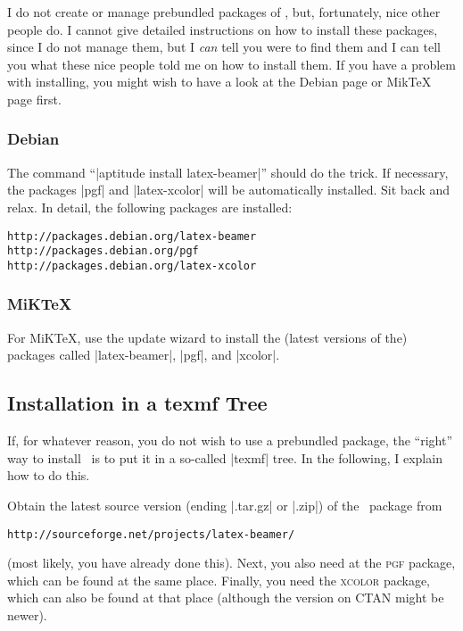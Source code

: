 I do not create or manage prebundled packages of \beamer, but,
fortunately, nice other people do. I cannot give detailed instructions
on how to install these packages, since I do not manage them, but I
\emph{can} tell you were to find them and I can tell you what these
nice people told me on how to install them. If you have a problem with
installing, you might wish to have a look at the Debian page or MikTeX
page first.


\subsubsection{Debian}

The command ``|aptitude install latex-beamer|'' should do the
trick. If necessary, the packages |pgf| and |latex-xcolor| will be
automatically installed. Sit back and relax. In detail, the following
packages are installed: 
\begin{verbatim}
http://packages.debian.org/latex-beamer
http://packages.debian.org/pgf
http://packages.debian.org/latex-xcolor
\end{verbatim}


\subsubsection{MiKTeX}

For MiK\TeX, use the update wizard to install the (latest versions of
the) packages called |latex-beamer|, |pgf|, and |xcolor|. 




\subsection{Installation in a texmf Tree}

If, for whatever reason, you do not wish to use a prebundled package,
the ``right'' way to install \beamer\ is to put it in a so-called
|texmf| tree. In the following, I explain how to do this.

Obtain the latest source version (ending |.tar.gz| or |.zip|) of the \beamer\
package from
\begin{verbatim}
http://sourceforge.net/projects/latex-beamer/
\end{verbatim}
(most likely, you have already done this). Next, you also need at
the \textsc{pgf} package, which can be found at the same
place. Finally, you need the  \textsc{xcolor} package, which can also
be found at that place (although the version on CTAN might be newer).

